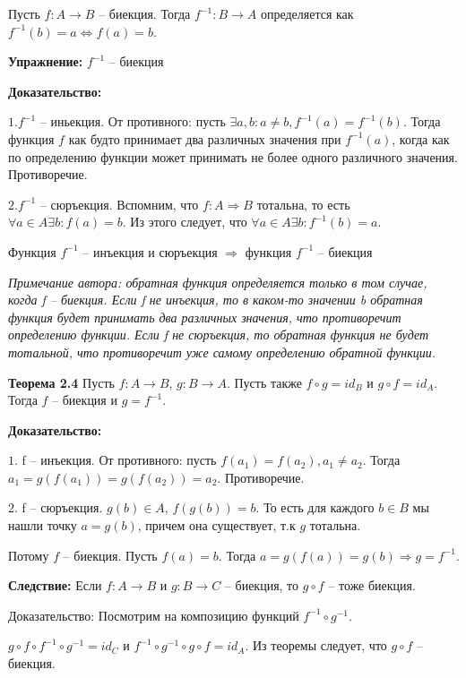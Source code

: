 \documentclass[openany]{article}
\begin{document}
   Пусть $f: A \rightarrow B$ -- биекция. Тогда $f^{-1}: B \rightarrow A$ определяется как $f^{-1}(b) = a \Leftrightarrow f(a) = b$.

   \textbf{Упражнение:} $f^{-1}$ -- биекция

   \textbf{Доказательство:}

   $1. f^{-1}$ -- иньекция. От противного: пусть $\exists a, b: a \neq b, f^{-1}(a) = f^{-1}(b)$. Тогда функция $f$ как будто принимает два различных значения при $f^{-1}(a)$, когда как по определению функции может принимать не более одного различного значения. Противоречие.

   $2. f^{-1}$ -- сюръекция. Вспомним, что $f: A \Rightarrow B$ тотальна, то есть $\forall a \in A \exists b: f(a) = b$. Из этого следует, что $\forall a \in A \exists b: f^{-1}(b) = a$.

   Функция $f^{-1}$ -- инъекция и сюръекция $\Rightarrow$ функция $f^{-1}$ -- биекция

   \textit{Примечание автора: обратная функция определяется только в том случае, когда f -- биекция. Если f не инъекция, то в каком-то значении b обратная функция будет принимать два различных значения, что противоречит определению функции. Если f не сюръекция, то обратная функция не будет тотальной, что противоречит уже самому определению обратной функции.}

   \textbf{Теорема 2.4} Пусть $f: A \rightarrow B$, $g: B \rightarrow A$. Пусть также $f \circ g = id_B$ и $g \circ f = id_A$. Тогда $f$ -- биекция и $g = f^{-1}$.

   \textbf{Доказательство:} 

   $1.$ f -- инъекция. От противного: пусть $f(a_1) = f(a_2), a_1 \neq a_2$. Тогда $a_1 = g(f(a_1)) = g(f(a_2)) = a_2$. Противоречие.

   $2.$ f -- сюръекция. $g(b) \in A$, $f(g(b)) = b$. То есть для каждого $b \in B$ мы нашли точку $a = g(b)$, причем она существует, т.к $g$ тотальна.

   Потому $f$ -- биекция. Пусть $f(a) = b$. Тогда $a = g(f(a)) = g(b) \Rightarrow g = f^{-1}$.

   \textbf{Следствие:} Если $f: A \rightarrow B$ и $g: B \rightarrow C$ -- биекция, то $g \circ f$ -- тоже биекция.

   Доказательство: Посмотрим на композицию функций $f^{-1} \circ g^{-1}$. 

   $g \circ f \circ f^{-1} \circ g^{-1} = id_C$ и $f^{-1} \circ g^{-1} \circ g \circ f = id_A$. Из теоремы следует, что $g \circ f$ -- биекция.
\end{document}
